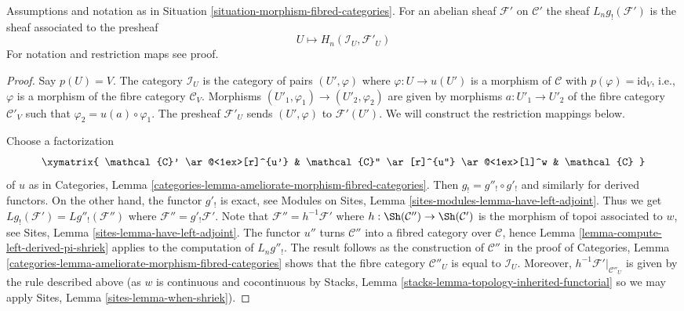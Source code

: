 \begin{lemma}
\label{lemma-compute-left-derived-g-shriek}
Assumptions and notation as in
Situation \ref{situation-morphism-fibred-categories}.
For an abelian sheaf $\mathcal{F}'$ on $\mathcal{C}'$ the sheaf
$L_ng_!(\mathcal{F}')$ is the sheaf associated to the presheaf
$$
U \longmapsto H_n(\mathcal{I}_U, \mathcal{F}'_U)
$$
For notation and restriction maps see proof.
\end{lemma}

\begin{proof}
Say $p(U) = V$. The category $\mathcal{I}_U$ is the category of pairs
$(U', \varphi)$ where $\varphi : U \to u(U')$ is a morphism of $\mathcal{C}$
with $p(\varphi) = \text{id}_V$, i.e., $\varphi$ is a morphism of the
fibre category $\mathcal{C}_V$. Morphisms
$(U'_1, \varphi_1) \to (U'_2, \varphi_2)$ are given by morphisms
$a : U'_1 \to U'_2$ of the fibre category $\mathcal{C}'_V$ such that
$\varphi_2 = u(a) \circ \varphi_1$. The presheaf $\mathcal{F}'_U$ sends
$(U', \varphi)$ to $\mathcal{F}'(U')$.
We will construct the restriction mappings below.

\medskip\noindent
Choose a factorization
$$
\xymatrix{
\mathcal{C}' \ar@<1ex>[r]^{u'} &
\mathcal{C}'' \ar[r]^{u''} \ar@<1ex>[l]^w & \mathcal{C}
}
$$
of $u$ as in
Categories, Lemma \ref{categories-lemma-ameliorate-morphism-fibred-categories}.
Then $g_! = g''_! \circ g'_!$ and similarly for derived functors.
On the other hand, the functor $g'_!$ is exact, see
Modules on Sites, Lemma \ref{sites-modules-lemma-have-left-adjoint}.
Thus we get $Lg_!(\mathcal{F}') = Lg''_!(\mathcal{F}'')$ where
$\mathcal{F}'' = g'_!\mathcal{F}'$. Note that
$\mathcal{F}'' = h^{-1}\mathcal{F}'$ where
$h : \Sh(\mathcal{C}'') \to \Sh(\mathcal{C}')$ is the morphism of topoi
associated to $w$, see
Sites, Lemma \ref{sites-lemma-have-left-adjoint}.
The functor $u''$ turns $\mathcal{C}''$ into a fibred category
over $\mathcal{C}$, hence
Lemma \ref{lemma-compute-left-derived-pi-shriek}
applies to the computation of $L_ng''_!$. The result follows as the
construction of $\mathcal{C}''$ in the proof of
Categories, Lemma \ref{categories-lemma-ameliorate-morphism-fibred-categories}
shows that the fibre category $\mathcal{C}''_U$ is equal to
$\mathcal{I}_U$. Moreover, $h^{-1}\mathcal{F}'|_{\mathcal{C}''_U}$
is given by the rule described above
(as $w$ is continuous and cocontinuous by
Stacks, Lemma \ref{stacks-lemma-topology-inherited-functorial}
so we may apply
Sites, Lemma \ref{sites-lemma-when-shriek}).
\end{proof}







